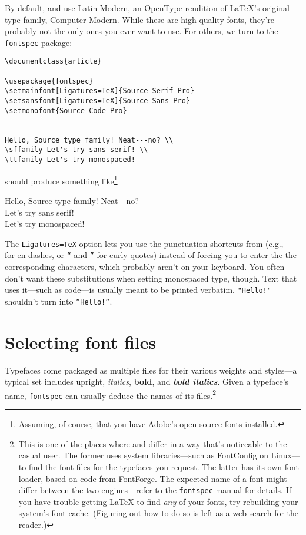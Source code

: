 By default, \LuaLaTeX{} and \XeLaTeX{} use Latin Modern,
an OpenType rendition of \LaTeX's original type family, Computer Modern.
While these are high-quality fonts,
they're probably not the only ones you ever want to use.
For others, we turn to the \texttt{fontspec} package:
\begin{leftfigure}
\begin{lstlisting}
\documentclass{article}

\usepackage{fontspec}
\setmainfont[Ligatures=TeX]{Source Serif Pro}
\setsansfont[Ligatures=TeX]{Source Sans Pro}
\setmonofont{Source Code Pro}


Hello, Source type family! Neat---no? \\
\sffamily Let's try sans serif! \\
\ttfamily Let's try monospaced!

\end{lstlisting}
\end{leftfigure}
should produce something like\footnote{Assuming, of course,
that you have Adobe's open-source fonts installed.\punckern{}}
\begin{leftfigure}
 Hello, Source type family! Neat---no? \\
 Let's try sans serif! \\
 Let's try monospaced!
\end{leftfigure}
The \verb|Ligatures=TeX| option lets you use the punctuation
shortcuts from  (e.g., \texttt{--} for en dashes, or
\texttt{``} and \texttt{''} for curly quotes)
instead of forcing you to enter the the corresponding characters,
which probably aren't on your keyboard.
You often don't want these substitutions when setting monospaced type, though.
Text that uses it---such as code---is usually meant to be printed
verbatim. \verb|"Hello!"| shouldn't turn into
\verb|“Hello!“|.

\section{Selecting font files}

Typefaces come packaged as multiple files for their various
weights and styles---a typical set includes upright,
\textit{italics},
\textbf{bold}, and
\textit{\textbf{bold italics}}.
Given a typeface's name,
\texttt{fontspec} can usually deduce the names of its
files.\punckern\footnote{This is
one of the places where \XeLaTeX{} and \LuaLaTeX{}
differ in a way that's noticeable to the casual user.
The former uses system libraries---such as FontConfig on Linux---to
find the font files for the typefaces you request.
The latter has its own font loader,
based on code from FontForge.\punckern{}
The expected name of a font might differ between the two engines---refer
to the \texttt{fontspec} manual for details.
If you have trouble getting \LaTeX{} to find \emph{any} of your fonts,
try rebuilding your system's font cache.
(Figuring out how to do so is left as a web search for the reader.)}

